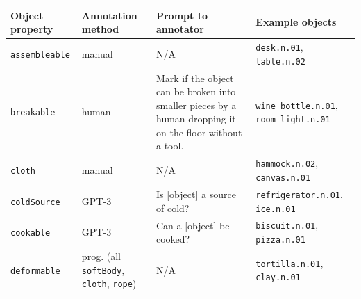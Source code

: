 {\scriptsize
\centering
\begin{longtable}{|l|p{}|p{}|p{}|}
        \hline
        \textbf{Object property} & \textbf{Annotation method} & \textbf{Prompt to annotator} & \textbf{Example objects}
        \\\hline
        \texttt{assembleable} & 
            manual &
            N/A & 
             \texttt{desk.n.01},  \texttt{table.n.02}
        \\\hline
        \texttt{breakable} & 
            human &
            Mark if the object can be broken into smaller pieces by a human dropping it on the floor without a tool.  & 
              \texttt{wine\_bottle.n.01}, \texttt{room\_light.n.01} 
        \\\hline
        \texttt{cloth} & 
            manual &
            N/A & 
             \texttt{hammock.n.02}, \texttt{canvas.n.01} 
        \\\hline
        \texttt{coldSource} & 
            GPT-3 &
            Is [object] a source of cold? & 
             \texttt{refrigerator.n.01}, \texttt{ice.n.01}
        \\\hline
        \texttt{cookable} & 
            GPT-3 &
            Can a [object] be cooked? & 
             \texttt{biscuit.n.01},
            \texttt{pizza.n.01}
        \\\hline
        \texttt{deformable} & 
             prog. (all \texttt{softBody}, \texttt{cloth}, \texttt{rope}) &
            N/A & 
              \texttt{tortilla.n.01},  \texttt{clay.n.01} 

\end{longtable}}
